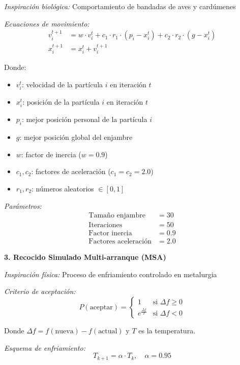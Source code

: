 \textit{Inspiración biológica:} Comportamiento de bandadas de aves y cardúmenes

\textit{Ecuaciones de movimiento:}
\begin{align}
v_{i}^{t+1} &= w \cdot v_{i}^{t} + c_1 \cdot r_1 \cdot (p_{i} - x_{i}^{t}) + c_2 \cdot r_2 \cdot (g - x_{i}^{t}) \\
x_{i}^{t+1} &= x_{i}^{t} + v_{i}^{t+1}
\end{align}

Donde:
\begin{itemize}
    \item $v_i^t$: velocidad de la partícula $i$ en iteración $t$
    \item $x_i^t$: posición de la partícula $i$ en iteración $t$
    \item $p_i$: mejor posición personal de la partícula $i$
    \item $g$: mejor posición global del enjambre
    \item $w$: factor de inercia ($w = 0.9$)
    \item $c_1, c_2$: factores de aceleración ($c_1 = c_2 = 2.0$)
    \item $r_1, r_2$: números aleatorios $\in [0,1]$
\end{itemize}

\textit{Parámetros:}
\begin{align}
\text{Tamaño enjambre} &= 30 \\
\text{Iteraciones} &= 50 \\
\text{Factor inercia} &= 0.9 \\
\text{Factores aceleración} &= 2.0
\end{align}

\textbf{3. Recocido Simulado Multi-arranque (MSA)}

\textit{Inspiración física:} Proceso de enfriamiento controlado en metalurgia

\textit{Criterio de aceptación:}
\begin{equation}
P(\text{aceptar}) = \begin{cases}
1 & \text{si } \Delta f \geq 0 \\
e^{\frac{\Delta f}{T}} & \text{si } \Delta f < 0
\end{cases}
\end{equation}

Donde $\Delta f = f(\text{nueva}) - f(\text{actual})$ y $T$ es la temperatura.

\textit{Esquema de enfriamiento:}
\begin{equation}
T_{k+1} = \alpha \cdot T_k, \quad \alpha = 0.95
\end{equation}

